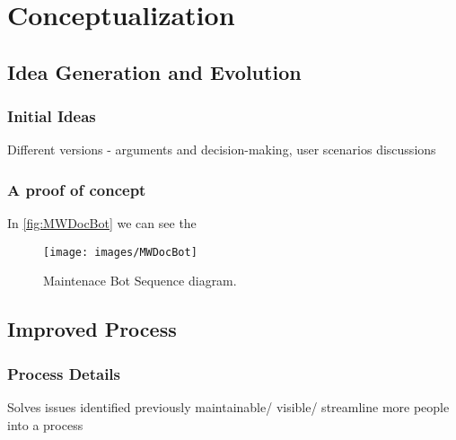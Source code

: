 \chapter{Conceptualization}\label{chapter:Conceptualization}

\section{Idea Generation and Evolution}
\subsection{Initial Ideas}

Different versions - arguments and decision-making, user scenarios discussions
\subsection{A proof of concept}

In \autoref{fig:MWDocBot}  we can see the 
\begin{figure}[H]
  \centering
  \texttt{[image: images/MWDocBot]}
  \caption[Maintenace Bot Sequence diagram]{Maintenace Bot Sequence diagram.}\label{fig:MWDocBot}
\end{figure}

\section{Improved Process}

\subsection{Process Details}
	Solves issues identified previously
 	maintainable/ visible/ streamline more people into a process
